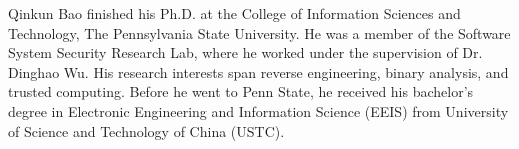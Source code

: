 
Qinkun Bao finished his Ph.D. at the College of Information Sciences
and Technology, The Pennsylvania State University. He was a member of the Software 
System Security Research Lab, where he worked under the supervision of Dr. Dinghao Wu.
His research interests span reverse engineering, binary analysis, and trusted computing. Before he went to Penn State, he received his bachelor's degree in Electronic Engineering and Information Science (EEIS) from University of Science and Technology of China (USTC).


 